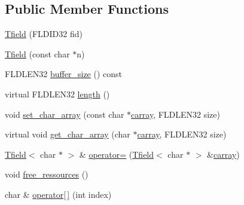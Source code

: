 \subsection*{Public Member Functions}
\begin{DoxyCompactItemize}
\item 
\hyperlink{classatmi_1_1_tfield_3_01char_01_5_01_4_ad16891d15a65e85408962ec962e57bd8}{Tfield} (F\+L\+D\+I\+D32 fid)
\item 
\hyperlink{classatmi_1_1_tfield_3_01char_01_5_01_4_a197bf4f86d8053adcf8afdcd839b85cc}{Tfield} (const char $\ast$n)
\item 
F\+L\+D\+L\+E\+N32 \hyperlink{classatmi_1_1_tfield_3_01char_01_5_01_4_a4dbdcf1e58232003aa20bb991f49f2f4}{buffer\+\_\+size} () const 
\item 
virtual F\+L\+D\+L\+E\+N32 \hyperlink{classatmi_1_1_tfield_3_01char_01_5_01_4_aa97dec8559724186b62997409f04bf3f}{length} ()
\item 
void \hyperlink{classatmi_1_1_tfield_3_01char_01_5_01_4_aa716c65e01963069f2abbe0ffee894f3}{set\+\_\+char\+\_\+array} (const char $\ast$\hyperlink{group__fml_ga8b57f9a4e2453d8e5d82ac0016e35e87}{carray}, F\+L\+D\+L\+E\+N32 size)
\item 
virtual void \hyperlink{classatmi_1_1_tfield_3_01char_01_5_01_4_a009218c6eec4478fb0e0a4c2741df5c2}{get\+\_\+char\+\_\+array} (char $\ast$\hyperlink{group__fml_ga8b57f9a4e2453d8e5d82ac0016e35e87}{carray}, F\+L\+D\+L\+E\+N32 size)
\item 
\hyperlink{classatmi_1_1_tfield}{Tfield}$<$ char $\ast$ $>$ \& \hyperlink{classatmi_1_1_tfield_3_01char_01_5_01_4_a486559e383ca6ae8002cb527901b716f}{operator=} (\hyperlink{classatmi_1_1_tfield}{Tfield}$<$ char $\ast$ $>$ \&\hyperlink{group__fml_ga8b57f9a4e2453d8e5d82ac0016e35e87}{carray})
\item 
void \hyperlink{classatmi_1_1_tfield_3_01char_01_5_01_4_a3bc71ae4ac7ae39aa21dd6533c230fda}{free\+\_\+ressources} ()
\item 
char \& \hyperlink{classatmi_1_1_tfield_3_01char_01_5_01_4_a0d4241c582c4e0af4e55ea6dfcf8ae8b}{operator\mbox{[}$\,$\mbox{]}} (int index)
\end{DoxyCompactItemize}
